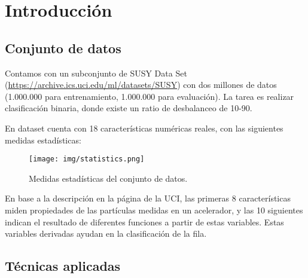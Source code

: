 \section{Introducción}

\subsection{Conjunto de datos}


Contamos con un subconjunto de SUSY Data Set (\url{https://archive.ics.uci.edu/ml/datasets/SUSY}) con dos millones de datos (1.000.000 para entrenamiento, 1.000.000 para evaluación). La tarea es realizar clasificación binaria, donde existe un ratio de desbalanceo de 10-90.

En dataset cuenta con 18 características numéricas reales, con las siguientes medidas estadísticas:

\begin{figure}[ht]
    \centerfloat
    \texttt{[image: img/statistics.png]}
    \caption{Medidas estadísticas del conjunto de datos.}
\end{figure}

En base a la descripción en la página de la UCI, las primeras 8 características miden propiedades de las partículas medidas en un acelerador, y las 10 siguientes indican el resultado de diferentes funciones a partir de estas variables. Estas variables derivadas ayudan en la clasificación de la fila.

\subsection{Técnicas aplicadas}

